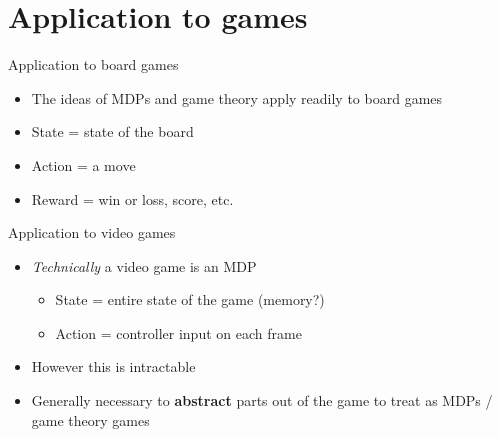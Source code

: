 \part{Application to games}
\frame{\partpage}

\begin{frame}{Application to board games}
	\begin{itemize}
		\pause\item The ideas of MDPs and game theory apply readily to board games
		\pause\item State = state of the board
		\pause\item Action = a move
		\pause\item Reward = win or loss, score, etc.
	\end{itemize}
\end{frame}

\begin{frame}{Application to video games}
	\begin{itemize}
		\pause\item \textit{Technically} a video game is an MDP
			\begin{itemize}
				\pause\item State = entire state of the game (memory?)
				\pause\item Action = controller input on each frame
			\end{itemize}
		\pause\item However this is intractable
		\pause\item Generally necessary to \textbf{abstract} parts out of the game to treat as MDPs / game theory games
	\end{itemize}
\end{frame}

